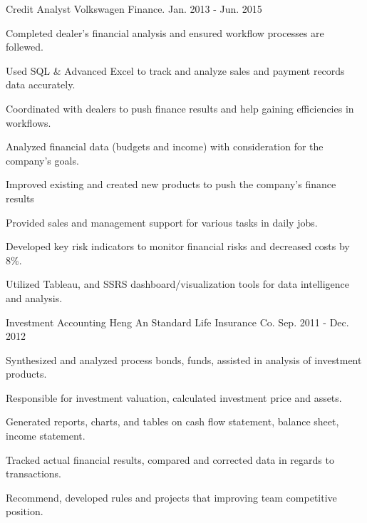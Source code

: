 \documentclass[11pt, a4paper]{awesome-cv}
\begin{document}


\begin{cventries}

  \cventry
    {Credit Analyst} %
    {Volkswagen Finance.} %
    {} %
    {Jan. 2013 - Jun. 2015} %
    {
      \begin{cvitems} %
        \item {Completed dealer's financial analysis and ensured workflow processes are follewed.}
        \item {Used SQL \& Advanced Excel to track and analyze sales and payment records data accurately.}
        \item {Coordinated with dealers to push finance results and help gaining efficiencies in workflows.}
        \item {Analyzed financial data (budgets and income) with consideration for the company's goals.}
        \item {Improved existing and created new products to push the company's finance results}
        \item {Provided sales and management support for various tasks in daily jobs.}
        \item {Developed key risk indicators to monitor financial risks and decreased costs by 8\%.}
        \item {Utilized Tableau, and SSRS dashboard/visualization tools for data intelligence and analysis.}
      \end{cvitems}
    }

  \cventry
    {Investment Accounting} %
    {Heng An Standard Life Insurance Co.} %
    {} %
    {Sep. 2011 - Dec. 2012} %
    {
      \begin{cvitems} %
        \item {Synthesized and analyzed process bonds, funds, assisted in analysis of investment products.}
        \item {Responsible for investment valuation, calculated investment price and assets.}
        \item {Generated reports, charts, and tables on cash flow statement, balance sheet, income statement.}
        \item {Tracked actual financial results, compared and corrected data in regards to transactions.}
        \item {Recommend, developed rules and projects that improving team competitive position.}
      \end{cvitems}
    }


\end{cventries}
\end{document}
